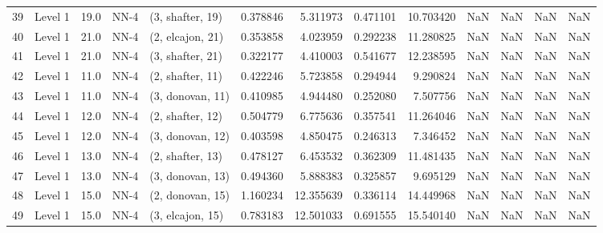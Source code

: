\begin{tabular}{llrllrrrrrrrr}
39 &   Level 1 &   19.0 &        NN-4 &  (3, shafter, 19) &   0.378846 &   5.311973 &  0.471101 &  10.703420 &                  NaN &                    NaN &                 NaN &                   NaN \\
40 &   Level 1 &   21.0 &        NN-4 &  (2, elcajon, 21) &   0.353858 &   4.023959 &  0.292238 &  11.280825 &                  NaN &                    NaN &                 NaN &                   NaN \\
41 &   Level 1 &   21.0 &        NN-4 &  (3, shafter, 21) &   0.322177 &   4.410003 &  0.541677 &  12.238595 &                  NaN &                    NaN &                 NaN &                   NaN \\
42 &   Level 1 &   11.0 &        NN-4 &  (2, shafter, 11) &   0.422246 &   5.723858 &  0.294944 &   9.290824 &                  NaN &                    NaN &                 NaN &                   NaN \\
43 &   Level 1 &   11.0 &        NN-4 &  (3, donovan, 11) &   0.410985 &   4.944480 &  0.252080 &   7.507756 &                  NaN &                    NaN &                 NaN &                   NaN \\
44 &   Level 1 &   12.0 &        NN-4 &  (2, shafter, 12) &   0.504779 &   6.775636 &  0.357541 &  11.264046 &                  NaN &                    NaN &                 NaN &                   NaN \\
45 &   Level 1 &   12.0 &        NN-4 &  (3, donovan, 12) &   0.403598 &   4.850475 &  0.246313 &   7.346452 &                  NaN &                    NaN &                 NaN &                   NaN \\
46 &   Level 1 &   13.0 &        NN-4 &  (2, shafter, 13) &   0.478127 &   6.453532 &  0.362309 &  11.481435 &                  NaN &                    NaN &                 NaN &                   NaN \\
47 &   Level 1 &   13.0 &        NN-4 &  (3, donovan, 13) &   0.494360 &   5.888383 &  0.325857 &   9.695129 &                  NaN &                    NaN &                 NaN &                   NaN \\
48 &   Level 1 &   15.0 &        NN-4 &  (2, donovan, 15) &   1.160234 &  12.355639 &  0.336114 &  14.449968 &                  NaN &                    NaN &                 NaN &                   NaN \\
49 &   Level 1 &   15.0 &        NN-4 &  (3, elcajon, 15) &   0.783183 &  12.501033 &  0.691555 &  15.540140 &                  NaN &                    NaN &                 NaN &                   NaN \\

\end{tabular}
